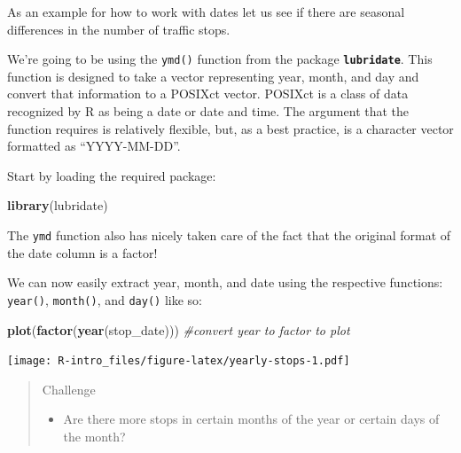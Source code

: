 \documentclass[
]{book}
\newenvironment{Shaded}{\begin{snugshade}}{\end{snugshade}}
\newcommand{\CommentTok}[1]{\textcolor[rgb]{0.56,0.35,0.01}{\textit{#1}}}
\newcommand{\KeywordTok}[1]{\textcolor[rgb]{0.13,0.29,0.53}{\textbf{#1}}}
\newcommand{\NormalTok}[1]{#1}
\newcommand{\OperatorTok}[1]{\textcolor[rgb]{0.81,0.36,0.00}{\textbf{#1}}}
\newcommand{\StringTok}[1]{\textcolor[rgb]{0.31,0.60,0.02}{#1}}
\providecommand{\tightlist}{%
  \setlength{\itemsep}{0pt}\setlength{\parskip}{0pt}}
\begin{document}
As an example for how to work with dates let us see if there are seasonal differences in the number of traffic stops.

We're going to be using the \texttt{ymd()} function from the package \textbf{\texttt{lubridate}}. This
function is designed to take a vector representing year, month, and day and convert
that information to a POSIXct vector. POSIXct is a class of data recognized by R as
being a date or date and time. The argument that the function requires is relatively
flexible, but, as a best practice, is a character vector formatted as ``YYYY-MM-DD''.

Start by loading the required package:

\begin{Shaded}
\begin{Highlighting}[]
\KeywordTok{library}\NormalTok{(lubridate)}
\end{Highlighting}
\end{Shaded}

\begin{Shaded}
\end{Shaded}

The \texttt{ymd} function also has nicely taken care of the fact that the original format of the date column is a factor!

We can now easily extract year, month, and date using the respective functions: \texttt{year()}, \texttt{month()}, and \texttt{day()} like so:

\begin{Shaded}
\begin{Highlighting}[]
\KeywordTok{plot}\NormalTok{(}\KeywordTok{factor}\NormalTok{(}\KeywordTok{year}\NormalTok{(stop_date))) }\CommentTok{#convert year to factor to plot}
\end{Highlighting}
\end{Shaded}

\texttt{[image: R-intro\_files/figure-latex/yearly-stops-1.pdf]}

\begin{quote}
Challenge

\begin{itemize}
\tightlist
\item
  Are there more stops in certain months of the year or certain days of the month?
\end{itemize}
\end{quote}
\end{document}
